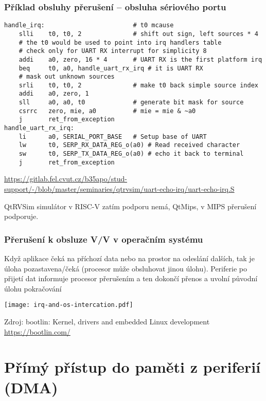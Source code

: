 \documentclass{beamer}
\begin{document}
\begin{frame}[fragile]
\frametitle{Příklad obsluhy přerušení -- obsluha sériového portu}

\begin{verbatim}
handle_irq:                        # t0 mcause
    slli    t0, t0, 2              # shift out sign, left sources * 4
    # the t0 would be used to point into irq handlers table
    # check only for UART RX interrupt for simplicity 8
    addi    a0, zero, 16 * 4       # UART RX is the first platform irq
    beq     t0, a0, handle_uart_rx_irq # it is UART RX
    # mask out unknown sources
    srli    t0, t0, 2              # make t0 back simple source index
    addi    a0, zero, 1
    sll     a0, a0, t0             # generate bit mask for source
    csrrc   zero, mie, a0          # mie = mie & ~a0
    j       ret_from_exception
handle_uart_rx_irq:
    li      a0, SERIAL_PORT_BASE   # Setup base of UART
    lw      t0, SERP_RX_DATA_REG_o(a0) # Read received character
    sw      t0, SERP_TX_DATA_REG_o(a0) # echo it back to terminal
    j       ret_from_exception
\end{verbatim}

\tiny

\url{https://gitlab.fel.cvut.cz/b35apo/stud-support/-/blob/master/seminaries/qtrvsim/uart-echo-irq/uart-echo-irq.S}

QtRVSim simulátor v RISC-V zatím podporu nemá, QtMips, v MIPS přerušení podporuje.

\end{frame}

\begin{frame}
\frametitle{Přerušení k obsluze V/V v operačním systému}

Když aplikace čeká na příchozí data nebo na prostor na odeslání dalších, tak je úloha pozastavena/čeká (procesor může obsluhovat jinou úlohu).
Periferie po přijetí dat informuje procesor přerušením a ten dokončí přenos a uvolní původní úlohu pokračování

\begin{center}
  \texttt{[image: irq-and-os-intercation.pdf]}
\end{center}

\tiny

Zdroj: bootlin: Kernel, drivers and embedded Linux development \url{https://bootlin.com/}

\end{frame}

\section{Přímý přístup do paměti z periferií (DMA)}
\end{document}
